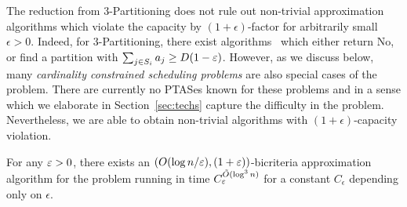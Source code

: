 The reduction from $3$-Partitioning does not rule out non-trivial approximation algorithms which violate the capacity by $(1+\epsilon)$-factor for arbitrarily small $\epsilon>0$. 
Indeed, for $3$-Partitioning, there exist algorithms~\cite{bibid} which either return No, or find a partition with $\sum_{j\in S_i} a_j \geq D(1-\varepsilon)$. %
However, as we discuss below, many {\em cardinality constrained scheduling problems} are also special cases of the \mckc problem. There are currently no PTASes known for these problems
and in a sense which we elaborate in Section~\ref{sec:techs} capture the difficulty in the problem. 
Nevertheless, we are able to obtain non-trivial algorithms with $(1+\epsilon)$-capacity violation.

\begin{theorem}\label{thm:1}
	For any $\varepsilon > 0$, there exists an $(O(\log n/\varepsilon), (1+\varepsilon))$-bicriteria approximation algorithm for the \mckc problem running in time $C_\varepsilon^{\tilde{O}(\log^3n)}$ for a constant $C_\epsilon$ depending only on $\epsilon$.
\end{theorem}
%
%
